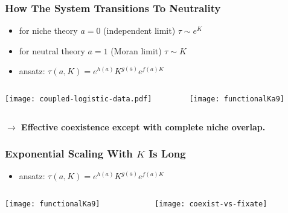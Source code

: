\documentclass[dvipsnames]{beamer}
\begin{document}
\begin{frame}
\frametitle{How The System Transitions To Neutrality}
\begin{itemize}
	\item for niche theory $a=0$ (independent limit) $\tau \sim e^K$
	\item for neutral theory $a=1$ (Moran limit) $\tau \sim K$
	\pause
	\item ansatz: $\tau(a,K) = e^{h(a)}K^{g(a)}e^{f(a)K}$
\end{itemize}
\pause
\begin{columns}
	\begin{column}{5cm}
		\begin{center}
			\texttt{[image: coupled-logistic-data.pdf]}
		\end{center}
	\end{column}
	\pause
	\begin{column}{6cm}
		\begin{center}
			\texttt{[image: functionalKa9]}
		\end{center}
	\end{column}
\end{columns}
\pause
\textbf{$\rightarrow$ Effective coexistence except with complete niche overlap.}
\end{frame}


\begin{frame}
\frametitle{Exponential Scaling With $K$ Is Long}
\begin{itemize}
	\item ansatz: $\tau(a,K) = e^{h(a)}K^{g(a)}e^{f(a)K}$
\end{itemize}
\begin{columns}
	\begin{column}{6cm}
		\begin{center}
			\texttt{[image: functionalKa9]}
		\end{center}
	\end{column}
	\begin{column}{5cm}
		\begin{center}
			\texttt{[image: coexist-vs-fixate]}
		\end{center}
	\end{column}
\end{columns}
\end{frame}
\end{document}
